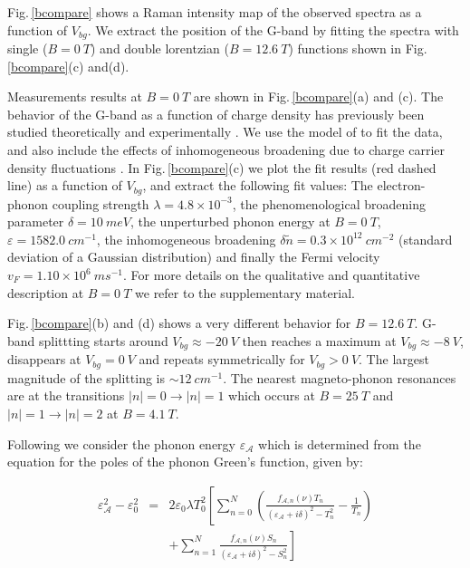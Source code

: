 \documentclass[prl,aps,superscriptaddress,showpacs,reprint]{revtex4-1}
\begin{document}
Fig.\,\ref{bcompare} shows a Raman intensity map of the observed spectra as a function of $V_{bg}$. We extract the position of the G-band by fitting the spectra with single ($B=0\: T$) and double lorentzian ($B=12.6\: T$) functions shown in Fig.\,\ref{bcompare}(c) and(d).

Measurements results at $B=0\: T$ are shown in Fig.\,\ref{bcompare}(a) and (c).
The behavior of the G-band  as a function of charge density has previously been studied theoretically and experimentally \cite{pisana2007breakdown,yan2007electric,stampfer2007raman,tsuneya2006anomaly}.  We use the model of \cite{tsuneya2006anomaly} to fit the data, and also include the effects of inhomogeneous broadening due to charge carrier density fluctuations \cite{yan2007electric}. In Fig.\,\ref{bcompare}(c) we plot the fit results (red dashed line) as a function of $V_{bg}$, and extract the following fit values: The electron-phonon coupling strength $\lambda = 4.8\times 10^{-3}$, the phenomenological broadening parameter \cite{tsuneya2006anomaly} $\delta=10\:  meV$, the unperturbed phonon energy at $B=0\: T$, $\varepsilon=1582.0\: cm^{-1}$, the inhomogeneous broadening $\delta \widetilde{n}=0.3\times 10^{12}\: cm^{-2}$ (standard deviation of a Gaussian distribution) and finally the Fermi velocity $v_F=1.10\times 10^6\: ms^{-1}$.  For more details on the qualitative and quantitative description at $B=0\: T$ we refer to the supplementary material.

Fig.\,\ref{bcompare}(b) and (d) shows a very different behavior for $B=12.6\: T$.
G-band splittting starts around $V_{bg}\approx -20\: V$ then reaches a maximum at $V_{bg}\approx-8\: V$, disappears at $V_{bg} = 0\: V$ and repeats symmetrically for $V_{bg}>0\: V$. The largest magnitude of the splitting is $\sim 12\: cm^{-1}$. The nearest magneto-phonon resonances are at the transitions $\left|n\right|=0 \rightarrow \left|n\right|=1$  which occurs at $B=25\: T$ and $\left|n\right|=1 \rightarrow \left|n\right|=2$ at $B=4.1\: T$.

Following \cite{goerbig2007filling,ando2007magnetic,kossacki2012circular}  we consider the  phonon energy $\varepsilon_{\mathcal{A}}$  which is determined from the equation for the poles of the phonon Green’s function, given by:

\begin{eqnarray}
\label{greens-full}
\varepsilon_{\mathcal{A}}^2-\varepsilon_0^2 &=& 2\varepsilon_0 \lambda T_0^2 \left[ \sum_{n=0}^N\left(\frac{f_{\mathcal{A},n}\left(\nu\right) T_n}{\left(\varepsilon_{\mathcal{A}}+i\delta\right)^2-T_n^2}-\frac{1}{T_n}\right)\right.\nonumber \\
& &\left. +\sum_{n=1}^{N}\frac{f_{\mathcal{A},n}\left(\nu\right) S_n}{\left(\varepsilon_{\mathcal{A}}+i\delta\right)^2-S_n^2}\right]
\end{eqnarray}
\end{document}
